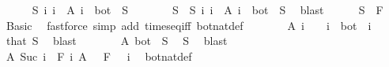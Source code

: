 \begin{isabellebody}
\isanewline
\ \ \ \ \isamarkupfalse%
\ {\isachardoublequoteopen}{\isasymexists}S{\isachardot}{\kern0pt}\ {\isacharparenleft}{\kern0pt}{\isasymUnion}i{\isachardot}{\kern0pt}\ {\isacharbraceleft}{\kern0pt}i{\isacharbraceright}{\kern0pt}\ {\isasymtimes}\ A\ i{\isacharparenright}{\kern0pt}\ {\isacharequal}{\kern0pt}\ {\isacharbraceleft}{\kern0pt}bot{\isacharbraceright}{\kern0pt}\ {\isasymtimes}\ S{\isachardoublequoteclose}\isanewline
\ \ \ \ \isamarkupfalse%
\ \isamarkupfalse%
\ S\ \ S{\isacharcolon}{\kern0pt}\ {\isachardoublequoteopen}{\isacharparenleft}{\kern0pt}{\isasymUnion}i{\isachardot}{\kern0pt}\ {\isacharbraceleft}{\kern0pt}i{\isacharbraceright}{\kern0pt}\ {\isasymtimes}\ A\ i{\isacharparenright}{\kern0pt}\ {\isacharequal}{\kern0pt}\ {\isacharbraceleft}{\kern0pt}bot{\isacharbraceright}{\kern0pt}\ {\isasymtimes}\ S{\isachardoublequoteclose}\ \isamarkupfalse%
\ blast\isanewline
\ \ \ \ \isamarkupfalse%
\ {\isachardoublequoteopen}S\ {\isasymin}\ F\ {}{\isachardoublequoteclose}\ \isamarkupfalse%
\ Basic\ \isamarkupfalse%
\ {\isacharparenleft}{\kern0pt}fastforce\ simp\ add{\isacharcolon}{\kern0pt}\ times{\isacharunderscore}{\kern0pt}eq{\isacharunderscore}{\kern0pt}iff\ bot{\isacharunderscore}{\kern0pt}nat{\isacharunderscore}{\kern0pt}def{\isacharparenright}{\kern0pt}\isanewline
\ \ \ \ \isamarkupfalse%
\ \isamarkupfalse%
\ {\isachardoublequoteopen}A\ i\ {\isacharequal}{\kern0pt}\ {\isacharbraceleft}{\kern0pt}{\isacharbraceright}{\kern0pt}{\isachardoublequoteclose}\ \ {\isachardoublequoteopen}i\ {\isasymnoteq}\ bot{\isachardoublequoteclose}\ \ i\ \isamarkupfalse%
\ that\ S\ \isamarkupfalse%
\ blast\isanewline
\ \ \ \ \isamarkupfalse%
\ \isamarkupfalse%
\ {\isachardoublequoteopen}A\ bot\ {\isacharequal}{\kern0pt}\ S{\isachardoublequoteclose}\ \isamarkupfalse%
\ S\ \isamarkupfalse%
\ blast\isanewline
\ \ \ \ \isamarkupfalse%
\ \isamarkupfalse%
\ {\isachardoublequoteopen}A\ {\isacharparenleft}{\kern0pt}Suc\ i{\isacharparenright}{\kern0pt}\ {\isasymin}\ F\ i{\isachardoublequoteclose}\ {\isachardoublequoteopen}A\ {}\ {\isasymin}\ F\ {}{\isachardoublequoteclose}\ \ i\ \isamarkupfalse%
\ bot{\isacharunderscore}{\kern0pt}nat{\isacharunderscore}{\kern0pt}def\ \isamarkupfalse%

\end{isabellebody}
